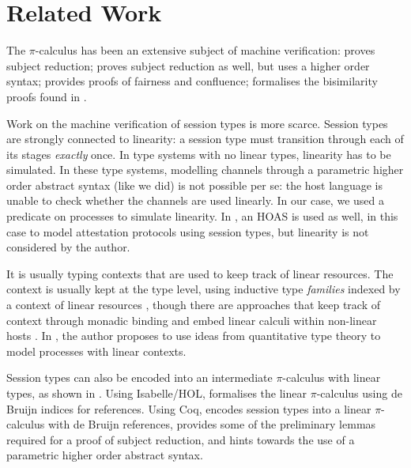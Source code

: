 \documentclass{mproj}
\newcommand{\picalc}{$\pi$-calculus}
\begin{document}

\chapter{Related Work}\label{related-work}

The \picalc{} has been an extensive subject of machine verification: \cite{Henry-Gerard1999} proves subject reduction; \cite{Despeyroux2000} proves subject reduction as well, but uses a higher order syntax; \cite{Affeldt2008} provides proofs of fairness and confluence; \cite{Honsell2001} formalises the bisimilarity proofs found in \cite{Walker1989}.

Work on the machine verification of session types is more scarce.  Session types are strongly connected to linearity: a session type must transition through each of its stages \emph{exactly} once. In type systems with no linear types, linearity has to be simulated. In these type systems, modelling channels through a parametric higher order abstract syntax \cite{Chlipala2008} (like we did) is not possible per se: the host language is unable to check whether the channels are used linearly. In our case, we used a predicate on processes to simulate linearity. In \cite{Petz}, an HOAS is used as well, in this case to model attestation protocols using session types, but linearity is not considered by the author.

It is usually typing contexts that are used to keep track of linear resources. The context is usually kept at the type level, using inductive type \emph{families} \cite{Dybjer1994} indexed by a context of linear resources \cite{Power2000}, though there are approaches that keep track of context through monadic binding and embed linear calculi within non-linear hosts \cite{Paykin2017}. In \cite{Kokke2019}, the author proposes to use ideas from quantitative type theory \cite{McBride2016} to model processes with linear contexts.

Session types can also be encoded into an intermediate \picalc{} with linear types, as shown in \cite{Dardha2017}. Using Isabelle/HOL, \cite{Gay2001} formalises the linear \picalc{} using de Bruijn indices \cite{deBruijn1972} for references. Using Coq, \cite{Dilmore2019} encodes session types into a linear \picalc{} with de Bruijn references, provides some of the preliminary lemmas required for a proof of subject reduction, and hints towards the use of a parametric higher order abstract syntax.
\end{document}
